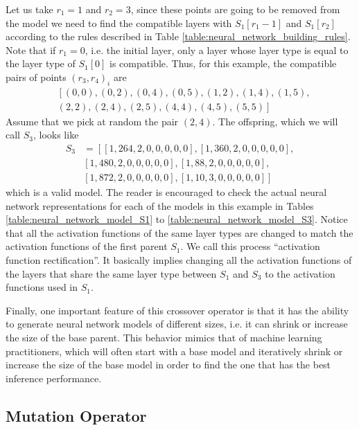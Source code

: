 \documentclass[12pt]{elsart}%
\begin{document}
Let us take $r_1 = 1$ and $r_2 = 3$, since these points are going to be removed from the model we need to find the compatible layers with $S_1[r_1-1]$ and $S_1[r_2]$ according to the rules described in Table \ref{table:neural_network_building_rules}. Note that if $r_1 = 0$, i.e. the initial layer, only a layer whose layer type is equal to the layer type of $S_1[0]$ is compatible. Thus, for this example, the compatible pairs of points $(r_3, r_4)_i$ are
\begin{align*}
& \left[ (0, 0), (0, 2), (0, 4), (0, 5), (1, 2), (1, 4), (1, 5), \right. \\
& \left. (2, 2), (2, 4), (2, 5), (4, 4), (4, 5), (5, 5) \right]
\end{align*} 
Assume that we pick at random the pair $(2,4)$. The offspring, which we will call $S_3$, looks like
\begin{align*}
S_3 & = \left[ \left[1, 264, 2, 0, 0, 0, 0, 0 \right], \left[1, 360, 2, 0, 0, 0, 0, 0 \right], \right. \\
& \left. \left[1, 480, 2, 0, 0, 0, 0, 0 \right] , \left[1, 88, 2, 0, 0, 0, 0, 0 \right], \right. \\
& \left. \left[1, 872, 2, 0, 0, 0, 0, 0 \right], \left[1, 10, 3, 0, 0, 0, 0, 0 \right] \right]
\end{align*}
which is a valid model. The reader is encouraged to check the actual neural network representations for each of the models in this example in Tables \ref{table:neural_network_model_S1} to \ref{table:neural_network_model_S3}. Notice that all the activation functions of the same layer types are changed to match the activation functions of the first parent $S_1$. We call this process ``activation function rectification''. It basically implies changing all the activation functions of the layers that share the same layer type between $S_1$ and $S_3$ to the activation functions used in $S_1$. 

Finally, one important feature of this crossover operator is that it has the ability to generate neural network models of different sizes, i.e. it can shrink or increase the size of the base parent. This behavior mimics that of machine learning practitioners, which will often start with a base model and iteratively shrink or increase the size of the base model in order to find the one that has the best inference performance.

\subsection{Mutation Operator}
\label{sec:mutation}
\end{document}

